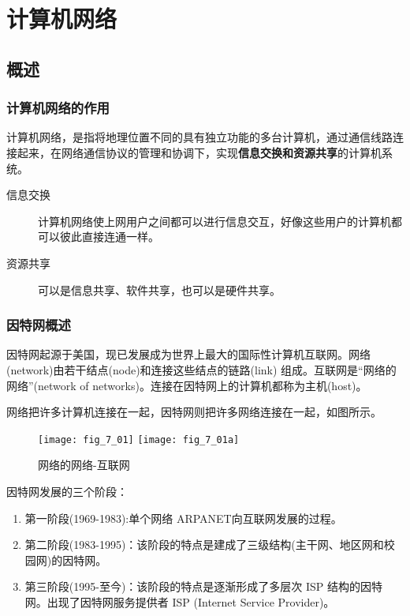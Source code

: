 \chapter{计算机网络}

\section{概述}


\subsection{计算机网络的作用}

计算机网络，是指将地理位置不同的具有独立功能的多台计算机，通过通信线路连接起来，在网络通信协议的管理和协调下，实现\textbf{信息交换和资源共享}的计算机系统。


\begin{description}
  \item[信息交换] 计算机网络使上网用户之间都可以进行信息交互，好像这些用户的计算机都可以彼此直接连通一样。
  \item[资源共享] 可以是信息共享、软件共享，也可以是硬件共享。
\end{description}



\subsection{因特网概述}

因特网起源于美国，现已发展成为世界上最大的国际性计算机互联网。网络(network)由若干结点(node)和连接这些结点的链路(link) 组成。互联网是“网络的网络”(network of networks)。连接在因特网上的计算机都称为主机(host)。

网络把许多计算机连接在一起，因特网则把许多网络连接在一起，如图所示。

\begin{figure}
  \centering
  \texttt{[image: fig\_7\_01]}
  \texttt{[image: fig\_7\_01a]}\\
  \caption{网络的网络-互联网}\label{fig_7_01}
\end{figure}


因特网发展的三个阶段：
\begin{enumerate}
  \item 第一阶段(1969-1983):单个网络 ARPANET向互联网发展的过程。

  \item 第二阶段(1983-1995)：该阶段的特点是建成了三级结构(主干网、地区网和校园网)的因特网。


  \item 第三阶段(1995-至今)：该阶段的特点是逐渐形成了多层次 ISP 结构的因特网。出现了因特网服务提供者 ISP (Internet Service Provider)。
\end{enumerate}


